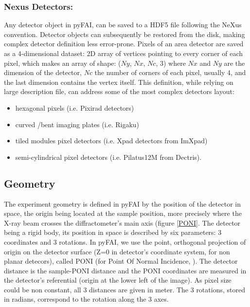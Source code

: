\documentclass[preprint]{iucr}
\begin{document}
\subsubsection{Nexus Detectors:}
Any detector object in pyFAI, can be saved to a HDF5 file following the NeXus
\cite{nexus} convention.
Detector objects can subsequently be restored from the disk, making
complex detector definition less error-prone.
Pixels of an area detector are saved as a 4-dimensional dataset: 2D
array of vertices pointing to every corner of each pixel, which makes an array
of shape: ($Ny$, $Nx$, $Nc$, 3) where $Nx$ and $Ny$ are the dimension of the
detector, $Nc$ the number of corners of each pixel, usually 4, and the last
dimension contains the vertex itself.
This definition, while relying on large description file,
can address some of the most complex detectors layout:
\begin{itemize}
  \item hexagonal pixels (i.e. Pixirad detectors)
  \item curved /bent imaging plates (i.e. Rigaku)
  \item tiled modules pixel detectors (i.e. Xpad detectors from ImXpad)
  \item semi-cylindrical pixel detectors (i.e. Pilatus12M from Dectris).
\end{itemize}

\subsection{Geometry}
The experiment geometry is defined in pyFAI by the position of the detector in
space, the origin being located at the sample position, more precisely where the
X-ray beam crosses the diffractometer's main axis (figure \ref{PONI}.
The detector being a rigid body, its position in space is described by
six parameters: 3 coordinates and 3 rotations.
In pyFAI, we use the point, orthogonal projection
of origin on the detector surface (Z=0 in detector's coordinate system, for
non planar detecors), called PONI (for Point Of Normal Incidence, \cite{spd}).
The detector distance is the sample-PONI distance
and the PONI coordinates are measured in the detector's referential (origin at the lower
left of the image). As pixel size could be non constant, all 3 distances are
given in meter.
The 3 rotations, stored in radians, correspond to the rotation along the 3
axes.
\end{document}
